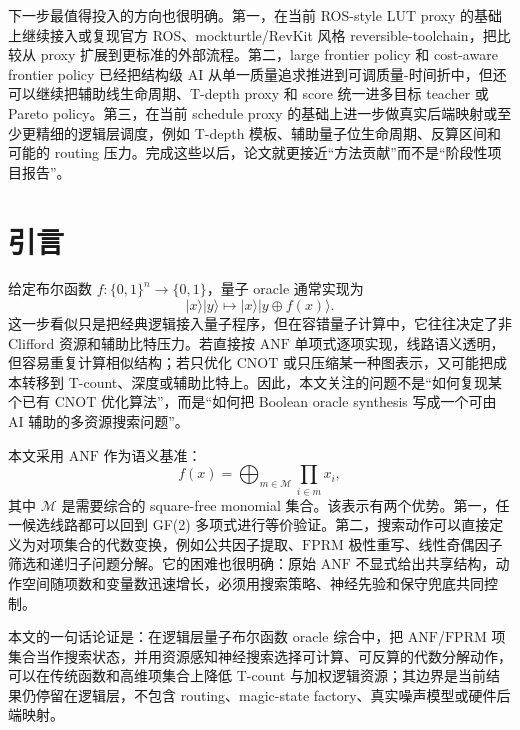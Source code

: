 \documentclass[UTF8,fontset=macnew,11pt]{ctexart}
\newcommand{\anf}{\ensuremath{\mathrm{ANF}}}
\newcommand{\fprm}{\ensuremath{\mathrm{FPRM}}}
\newcommand{\xor}{\ensuremath{\oplus}}
\begin{document}
下一步最值得投入的方向也很明确。第一，在当前 ROS-style LUT proxy 的基础上继续接入或复现官方 ROS、mockturtle/RevKit 风格 reversible-toolchain，把比较从 proxy 扩展到更标准的外部流程。第二，large frontier policy 和 cost-aware frontier policy 已经把结构级 AI 从单一质量追求推进到可调质量-时间折中，但还可以继续把辅助线生命周期、T-depth proxy 和 score 统一进多目标 teacher 或 Pareto policy。第三，在当前 schedule proxy 的基础上进一步做真实后端映射或至少更精细的逻辑层调度，例如 T-depth 模板、辅助量子位生命周期、反算区间和可能的 routing 压力。完成这些以后，论文就更接近“方法贡献”而不是“阶段性项目报告”。

\section{引言}

给定布尔函数 $f:\{0,1\}^n\rightarrow\{0,1\}$，量子 oracle 通常实现为
\begin{equation}
  |x\rangle |y\rangle \mapsto |x\rangle |y\xor f(x)\rangle .
  \label{eq:oracle}
\end{equation}
这一步看似只是把经典逻辑接入量子程序，但在容错量子计算中，它往往决定了非 Clifford 资源和辅助比特压力。若直接按 \anf{} 单项式逐项实现，线路语义透明，但容易重复计算相似结构；若只优化 CNOT 或只压缩某一种图表示，又可能把成本转移到 T-count、深度或辅助比特上。因此，本文关注的问题不是“如何复现某个已有 CNOT 优化算法”，而是“如何把 Boolean oracle synthesis 写成一个可由 AI 辅助的多资源搜索问题”。

本文采用 \anf{} 作为语义基准：
\begin{equation}
  f(x)=\bigoplus_{m\in\mathcal{M}}\prod_{i\in m}x_i ,
  \label{eq:anf}
\end{equation}
其中 $\mathcal{M}$ 是需要综合的 square-free monomial 集合。该表示有两个优势。第一，任一候选线路都可以回到 GF(2) 多项式进行等价验证。第二，搜索动作可以直接定义为对项集合的代数变换，例如公共因子提取、\fprm{} 极性重写、线性奇偶因子筛选和递归子问题分解。它的困难也很明确：原始 \anf{} 不显式给出共享结构，动作空间随项数和变量数迅速增长，必须用搜索策略、神经先验和保守兜底共同控制。

本文的一句话论证是：在逻辑层量子布尔函数 oracle 综合中，把 \anf{}/\fprm{} 项集合当作搜索状态，并用资源感知神经搜索选择可计算、可反算的代数分解动作，可以在传统函数和高维项集合上降低 T-count 与加权逻辑资源；其边界是当前结果仍停留在逻辑层，不包含 routing、magic-state factory、真实噪声模型或硬件后端映射。
\end{document}
